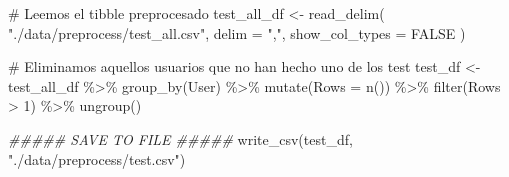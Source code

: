 \documentclass[
  12pt,
  a4paper,
  extrafontsizes,
  onecolumn,
  openright]{memoir}
\newenvironment{Shaded}{\begin{snugshade}}{\end{snugshade}}
\newcommand{\AttributeTok}[1]{\textcolor[rgb]{0.40,0.45,0.13}{#1}}
\newcommand{\CommentTok}[1]{\textcolor[rgb]{0.37,0.37,0.37}{#1}}
\newcommand{\ConstantTok}[1]{\textcolor[rgb]{0.56,0.35,0.01}{#1}}
\newcommand{\DecValTok}[1]{\textcolor[rgb]{0.68,0.00,0.00}{#1}}
\newcommand{\DocumentationTok}[1]{\textcolor[rgb]{0.37,0.37,0.37}{\textit{#1}}}
\newcommand{\FunctionTok}[1]{\textcolor[rgb]{0.28,0.35,0.67}{#1}}
\newcommand{\NormalTok}[1]{\textcolor[rgb]{0.00,0.23,0.31}{#1}}
\newcommand{\OtherTok}[1]{\textcolor[rgb]{0.00,0.23,0.31}{#1}}
\newcommand{\SpecialCharTok}[1]{\textcolor[rgb]{0.37,0.37,0.37}{#1}}
\newcommand{\StringTok}[1]{\textcolor[rgb]{0.13,0.47,0.30}{#1}}
\begin{document}
\begin{Shaded}
\begin{Highlighting}[]
\CommentTok{\# Leemos el tibble preprocesado}
\NormalTok{test\_all\_df }\OtherTok{\textless{}{-}} \FunctionTok{read\_delim}\NormalTok{(}
    \StringTok{"./data/preprocess/test\_all.csv"}\NormalTok{,}
    \AttributeTok{delim =} \StringTok{","}\NormalTok{, }\AttributeTok{show\_col\_types =} \ConstantTok{FALSE}
\NormalTok{)}

\CommentTok{\# Eliminamos aquellos usuarios que no han hecho uno de los test}
\NormalTok{test\_df }\OtherTok{\textless{}{-}}\NormalTok{ test\_all\_df }\SpecialCharTok{\%\textgreater{}\%}
    \FunctionTok{group\_by}\NormalTok{(User) }\SpecialCharTok{\%\textgreater{}\%}
    \FunctionTok{mutate}\NormalTok{(}\AttributeTok{Rows =} \FunctionTok{n}\NormalTok{()) }\SpecialCharTok{\%\textgreater{}\%}
    \FunctionTok{filter}\NormalTok{(Rows }\SpecialCharTok{\textgreater{}} \DecValTok{1}\NormalTok{) }\SpecialCharTok{\%\textgreater{}\%}
    \FunctionTok{ungroup}\NormalTok{()}

\DocumentationTok{\#\#\#\#\# SAVE TO FILE \#\#\#\#\#}
\FunctionTok{write\_csv}\NormalTok{(test\_df, }\StringTok{"./data/preprocess/test.csv"}\NormalTok{)}


\end{Highlighting}
\end{Shaded}
\end{document}
